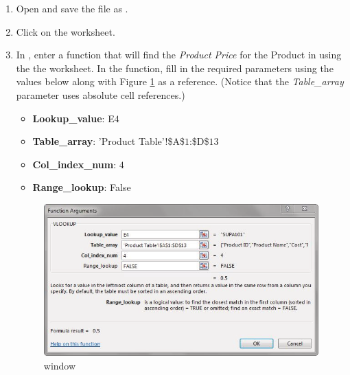 \begin{enumbox}
	\begin{enumerate}
		\item Open  and save the file as .
		\item Click on the  worksheet.
		\item In , enter a  function that will find the \textit{Product Price} for the Product in  using the the  worksheet. In the  function, fill in the required parameters using the values below along with Figure \ref{05:fig32} as a reference. (Notice that the \textit{Table\_array} parameter uses absolute cell references.)
		
		\begin{itemize}
			\item \textbf{Lookup\_value}: E$ 4 $
			\item \textbf{Table\_array}: 'Product Table'!\$A\$$ 1 $:\$D\$$ 13 $
			\item \textbf{Col\_index\_num}: $ 4 $
			\item \textbf{Range\_lookup}: False
		\end{itemize}
	
		\begin{figure}[H]
			\centering
			\includegraphics[width=\maxwidth{.95\linewidth}]{gfx/ch05_fig32}
			\caption{ window}
			\label{05:fig32}
		\end{figure}


\end{enumerate}
\end{enumbox}
